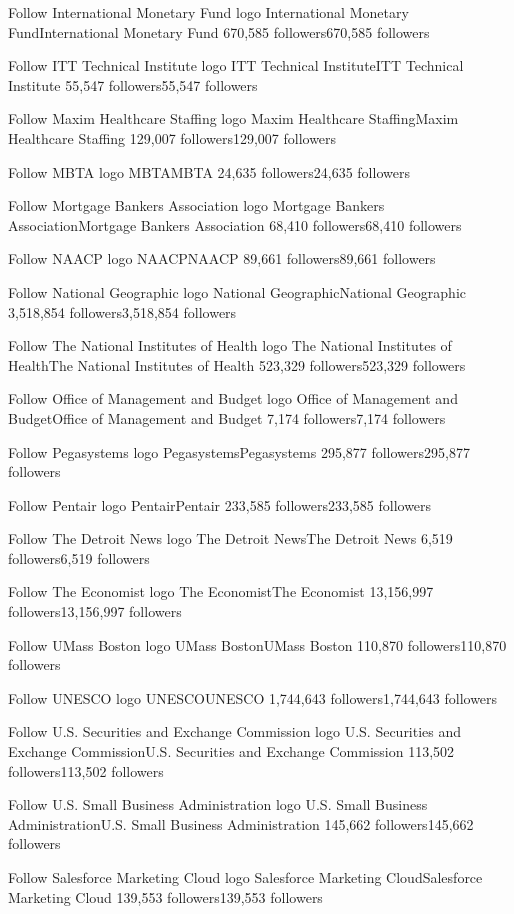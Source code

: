 Follow
International Monetary Fund logo
International Monetary FundInternational Monetary Fund
670,585 followers670,585 followers

Follow
ITT Technical Institute logo
ITT Technical InstituteITT Technical Institute
55,547 followers55,547 followers

Follow
Maxim Healthcare Staffing logo
Maxim Healthcare StaffingMaxim Healthcare Staffing
129,007 followers129,007 followers

Follow
MBTA logo
MBTAMBTA
24,635 followers24,635 followers

Follow
Mortgage Bankers Association logo
Mortgage Bankers AssociationMortgage Bankers Association
68,410 followers68,410 followers

Follow
NAACP logo
NAACPNAACP
89,661 followers89,661 followers

Follow
National Geographic logo
National GeographicNational Geographic
3,518,854 followers3,518,854 followers

Follow
The National Institutes of Health logo
The National Institutes of HealthThe National Institutes of Health
523,329 followers523,329 followers

Follow
Office of Management and Budget logo
Office of Management and BudgetOffice of Management and Budget
7,174 followers7,174 followers

Follow
Pegasystems logo
PegasystemsPegasystems
295,877 followers295,877 followers

Follow
Pentair logo
PentairPentair
233,585 followers233,585 followers

Follow
The Detroit News logo
The Detroit NewsThe Detroit News
6,519 followers6,519 followers

Follow
The Economist logo
The EconomistThe Economist
13,156,997 followers13,156,997 followers

Follow
UMass Boston logo
UMass BostonUMass Boston
110,870 followers110,870 followers

Follow
UNESCO logo
UNESCOUNESCO
1,744,643 followers1,744,643 followers

Follow
U.S. Securities and Exchange Commission logo
U.S. Securities and Exchange CommissionU.S. Securities and Exchange Commission
113,502 followers113,502 followers

Follow
U.S. Small Business Administration logo
U.S. Small Business AdministrationU.S. Small Business Administration
145,662 followers145,662 followers

Follow
Salesforce Marketing Cloud logo
Salesforce Marketing CloudSalesforce Marketing Cloud
139,553 followers139,553 followers


